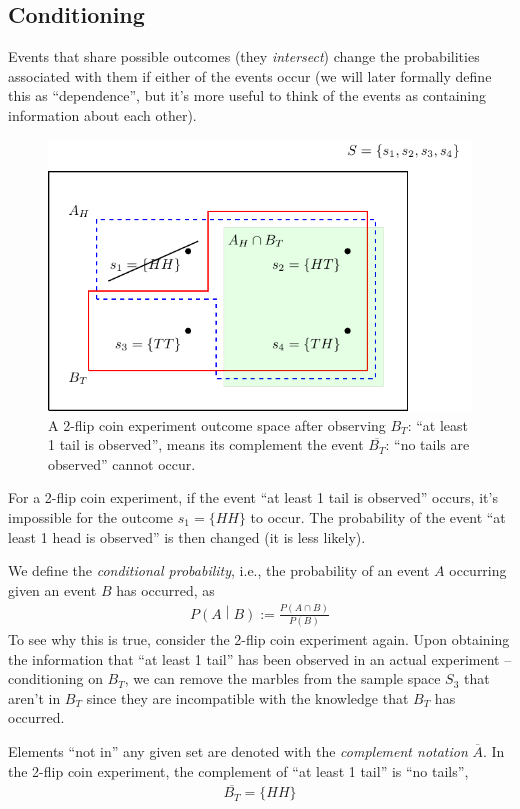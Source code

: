 \subsection{Conditioning}

Events that share possible outcomes (they \emph{intersect}) change the probabilities
associated with them if either of the events occur 
(we will later formally define this as ``dependence'', 
but it's more useful to think of the events as containing information about each other).

\begin{figure}[ht!]
\centering
\includegraphics[width=0.6\linewidth]{tikz/figure2.pdf}
\caption{%
A 2-flip coin experiment outcome space after observing \(B_{T}\): ``at least 1 tail is observed'',
means its complement the event \(\overline{B_{T}}\): ``no tails are observed'' cannot occur.}
\label{fig:conditioning}
\end{figure}

For a 2-flip coin experiment, 
if the event ``at least 1 tail is observed'' occurs, 
it's impossible for the outcome \(s_{1} = \{HH\}\) to occur. 
The probability of the event ``at least 1 head is observed'' is then changed (it is less likely).

We define the \emph{conditional probability}, 
i.e., the probability of an event \(A\) occurring given an event \(B\) has occurred, as
\begin{align}
P\left( A \middle| B \right) := \frac{P(A \cap B)}{P(B)}
\end{align}
To see why this is true, 
consider the 2-flip coin experiment again. 
Upon obtaining the information that ``at least 1 tail'' has been observed in an actual experiment 
-- conditioning on \(B_{T}\), 
we can remove the marbles from the sample space \(S_{3}\) that aren't in \(B_{T}\) 
since they are incompatible with the knowledge that \(B_{T}\) has occurred.

Elements ``not in'' any given set are denoted with the \emph{complement notation} \(\overline{A}\). 
In the 2-flip coin experiment, 
the complement of ``at least 1 tail'' is ``no tails'',
\begin{align}
\overline{B_{T}} = \{ HH\}
\end{align}

